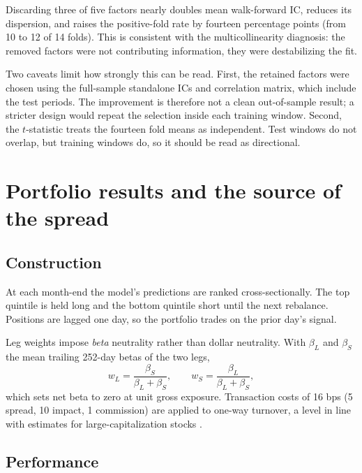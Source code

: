 \documentclass[11pt]{article}
\begin{document}
Discarding three of five factors nearly doubles mean walk-forward IC, reduces
its dispersion, and raises the positive-fold rate by fourteen percentage points
(from 10 to 12 of 14 folds). This is consistent with the multicollinearity
diagnosis: the removed factors were not contributing information, they were
destabilizing the fit.

Two caveats limit how strongly this can be read. First, the retained factors
were chosen using the full-sample standalone ICs and correlation matrix, which
include the test periods. The improvement is therefore not a clean
out-of-sample result; a stricter design would repeat the selection inside each
training window. Second, the $t$-statistic treats the fourteen fold means as
independent. Test windows do not overlap, but training windows do, so it should
be read as directional.

\section{Portfolio results and the source of the spread}
\label{sec:portfolio}

\subsection{Construction}

At each month-end the model's predictions are ranked cross-sectionally. The top
quintile is held long and the bottom quintile short until the next rebalance.
Positions are lagged one day, so the portfolio trades on the prior day's signal.

Leg weights impose \emph{beta} neutrality rather than dollar neutrality. With
$\beta_L$ and $\beta_S$ the mean trailing 252-day betas of the two legs,
\[
w_L = \frac{\beta_S}{\beta_L + \beta_S}, \qquad
w_S = \frac{\beta_L}{\beta_L + \beta_S},
\]
which sets net beta to zero at unit gross exposure. Transaction costs of 16 bps
(5 spread, 10 impact, 1 commission) are applied to one-way turnover, a level in
line with estimates for large-capitalization stocks \citep{novymarx2016}.

\subsection{Performance}
\end{document}
